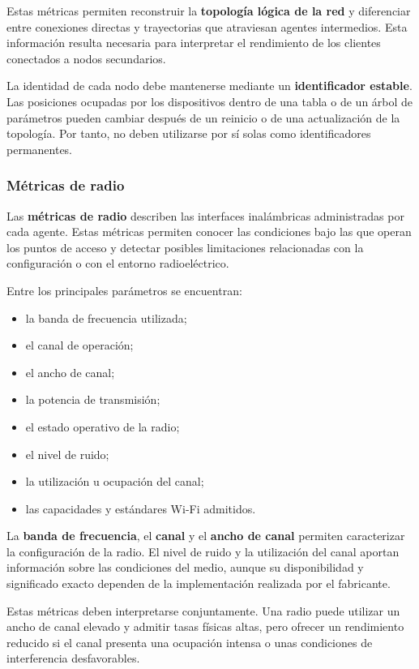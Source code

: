 Estas métricas permiten reconstruir la
\textbf{topología lógica de la red} y diferenciar entre conexiones
directas y trayectorias que atraviesan agentes intermedios. Esta
información resulta necesaria para interpretar el rendimiento de los
clientes conectados a nodos secundarios.

La identidad de cada nodo debe mantenerse mediante un
\textbf{identificador estable}. Las posiciones ocupadas por los
dispositivos dentro de una tabla o de un árbol de parámetros pueden
cambiar después de un reinicio o de una actualización de la topología.
Por tanto, no deben utilizarse por sí solas como identificadores
permanentes.

\subsubsection*{Métricas de radio}

Las \textbf{métricas de radio} describen las interfaces inalámbricas
administradas por cada agente. Estas métricas permiten conocer las
condiciones bajo las que operan los puntos de acceso y detectar posibles
limitaciones relacionadas con la configuración o con el entorno
radioeléctrico.

Entre los principales parámetros se encuentran:

\begin{itemize}
    \item la banda de frecuencia utilizada;
    \item el canal de operación;
    \item el ancho de canal;
    \item la potencia de transmisión;
    \item el estado operativo de la radio;
    \item el nivel de ruido;
    \item la utilización u ocupación del canal;
    \item las capacidades y estándares Wi-Fi admitidos.
\end{itemize}

La \textbf{banda de frecuencia}, el \textbf{canal} y el
\textbf{ancho de canal} permiten caracterizar la configuración de la
radio. El nivel de ruido y la utilización del canal aportan información
sobre las condiciones del medio, aunque su disponibilidad y significado
exacto dependen de la implementación realizada por el fabricante.

Estas métricas deben interpretarse conjuntamente. Una radio puede utilizar
un ancho de canal elevado y admitir tasas físicas altas, pero ofrecer un
rendimiento reducido si el canal presenta una ocupación intensa o unas
condiciones de interferencia desfavorables.

